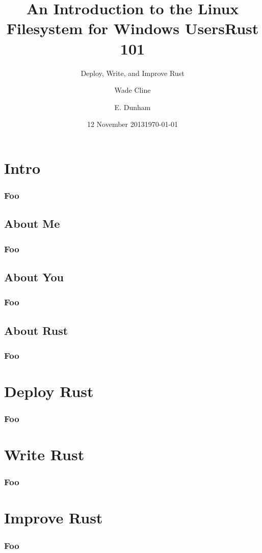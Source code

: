 \documentclass[xcolor={dvipsnames,svgnames},hyperref=dvips]{beamer}
\title[Linux Filesystems Introduction]{An Introduction to the Linux Filesystem
for Windows Users}
\author{Wade Cline}
\date{12 November 2013}
\title{Rust 101}
\subtitle{Deploy, Write, and Improve Rust}
\author{E. Dunham}
\institute{talks.edunham.net/lca2017/rust101}
\date{\today}
\begin{document}
\begin{frame}
\titlepage
\end{frame}

\section{Intro}

    \begin{frame}
        \frametitle{Foo}
        \tableofcontents
    \end{frame}


\subsection{About Me}

    \begin{frame}
        \frametitle{Foo}
    \end{frame}


\subsection{About You}

    \begin{frame}
        \frametitle{Foo}
    \end{frame}


\subsection{About Rust}

    \begin{frame}
        \frametitle{Foo}
    \end{frame}

\section{Deploy Rust}

    \begin{frame}
        \frametitle{Foo}
    \end{frame}


\section{Write Rust}

    \begin{frame}
        \frametitle{Foo}
    \end{frame}


\section{Improve Rust}

    \begin{frame}
        \frametitle{Foo}
    \end{frame}
\end{document}
